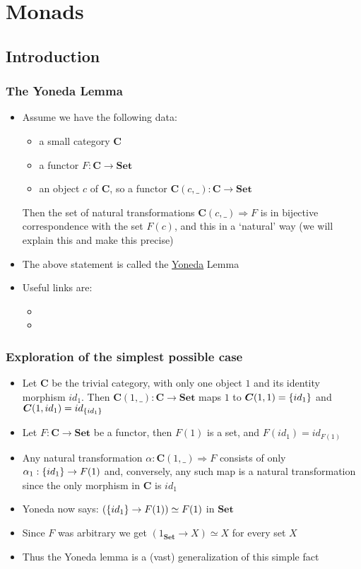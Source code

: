 \documentclass[handout]{beamer}
\title[INF223 presentations]{}
\newcommand{\To}{\Rightarrow}
\newcommand{\bfsf}[1]{{\boldsymbol{#1}}}
\newcommand{\Set}{\bfsf{Set}}
\newcommand{\CC}{\bfsf{C}}
\begin{document}
\section{Monads}
\subsection{Introduction}
 
\frame
  {   
    \frametitle{The Yoneda Lemma}\label{Yon:Intro}

 \begin{itemize}[<+->]
\item Assume we have the following data:
\begin{itemize}
    \item a small category $\CC$
    \item a functor $F:\CC\to\Set$
    \item an object $c$ of $\CC$, so a functor $\CC(c,\_):\CC\to\Set$
 \end{itemize}
Then the set of natural transformations $\CC(c,\_)\To F$ is in bijective
correspondence with the set $F(c)$, and this in a `natural' way
(we will explain this and make this precise)
\item The above statement is called the 
\href{https://en.wikipedia.org/wiki/Nobuo_Yoneda}{\color{blue}Yoneda} Lemma
\item Useful links are:
 \begin{itemize}
    \item {}
    \item {}
 \end{itemize}
 \end{itemize}

 }

\frame
  {   
    \frametitle{Exploration of the simplest possible case}\label{Yon:Triv}

 \begin{itemize}[<+->]
\item Let $\CC$ be the trivial category, with only one object $1$ and
 its identity morphism $id_1$. Then $\CC(1,\_):\CC\to\Set$ maps
$1$ to $\CC(1,1) = \set{id_1}$ and $\CC(1,id_1) = id_{\set{id_1}}$
\item Let $F:\CC\to\Set$ be a functor, then $F(1)$ is a set, and
$F(id_1) = id_{F(1)}$
\item Any natural transformation $\alpha: \CC(1,\_)\To F$ consists of
only $\alpha_1: \{id_1\} \to F(1)$ and,
conversely, any such map is a natural transformation
since the only morphism in $\CC$ is $id_1$
\item Yoneda now says:  $(\{id_1\} \to F(1)) \simeq F(1)$ in $\Set$
\item Since $F$ was arbitrary we get  $(1_\Set \to X) \simeq X$ for every set $X$
\item Thus the Yoneda lemma is a (vast) generalization of this simple fact
 \end{itemize}

 }
\end{document}

